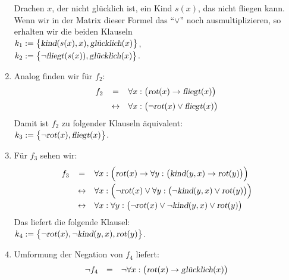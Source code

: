 \begin{enumerate}
      Drachen $x$, der nicht gl\"{u}cklich ist, ein Kind $s(x)$, das nicht fliegen kann.
      Wenn wir in der Matrix dieser Formel das ``$\vee$'' noch ausmultiplizieren, so
      erhalten wir die beiden Klauseln 
      \\[0.2cm]
      \hspace*{1.3cm} $k_1 := \bigl\{ \textsl{kind}(s(x),x), \textsl{gl\"{u}cklich}(x) \bigl\}$,   \\[0.2cm]
      \hspace*{1.3cm} $k_2 := \bigl\{ \neg \textsl{fliegt}(s(x)), \textsl{gl\"{u}cklich}(x) \bigl\}$. 
\item Analog finden wir f\"{u}r $f_2$:
 $$
        \begin{array}{lcl}
            f_2 & =  & \forall x: \bigl(\textsl{rot}(x) \rightarrow \textsl{fliegt}(x) \bigr) \\[0.2cm]
            & \leftrightarrow  & \forall x: \bigl(\neg \textsl{rot}(x) \vee \textsl{fliegt}(x) \bigr)
        \end{array}
      $$ 
      Damit ist $f_2$ zu folgender Klauseln \"{a}quivalent: \\[0.2cm]
      \hspace*{1.3cm} $k_3 := \bigl\{ \neg \textsl{rot}(x), \textsl{fliegt}(x) \bigl\}$.
\item F\"{u}r $f_3$ sehen wir:
 $$
        \begin{array}{lcl}
          f_3 & =          & \forall x: \Bigl(\textsl{rot}(x) \rightarrow 
                             \forall y: \bigl(\textsl{kind}(y,x) \rightarrow \textsl{rot}(y)\bigr) \Bigr) 
          \\[0.2cm]
          &\leftrightarrow & \forall x: \Bigl(\neg \textsl{rot}(x) \vee 
                             \forall y: \bigl(\neg \textsl{kind}(y,x) \vee \textsl{rot}(y)\bigr)\Bigr) 
          \\[0.2cm]
          &\leftrightarrow & \forall x: \forall y: \bigl(\neg \textsl{rot}(x) \vee \neg \textsl{kind}(y,x) \vee \textsl{rot}(y)\bigr)
        \end{array}
      $$
     Das liefert die folgende Klausel: \\[0.2cm]
     \hspace*{1.3cm} $ k_4 := \bigl\{ \neg \textsl{rot}(x), \neg \textsl{kind}(y,x), \textsl{rot}(y)\bigl\}$.
\item Umformung der Negation von $f_4$ liefert:
 $$
        \begin{array}{lcl}
\neg f_4 & =      & \neg \forall x: \bigl(\textsl{rot}(x) \rightarrow \textsl{gl\"{u}cklich}(x)\bigr) 

\end{array}$$
\end{enumerate}
